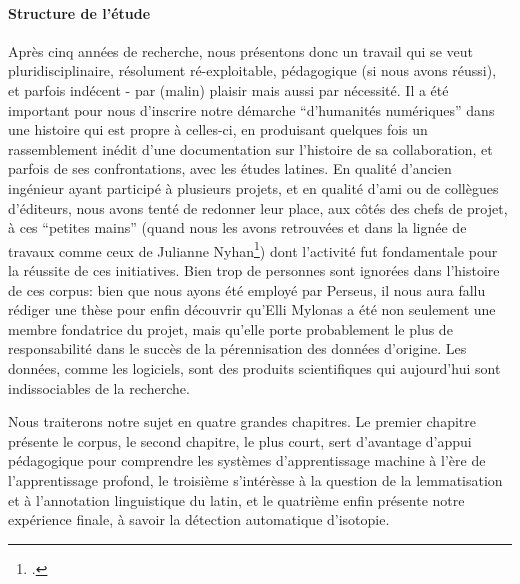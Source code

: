 \paragraph{Structure de l'étude}

Après cinq années de recherche, nous présentons donc un travail qui se veut pluridisciplinaire, résolument ré-exploitable, pédagogique (si nous avons réussi), et parfois indécent - par (malin) plaisir mais aussi par nécessité. Il a été important pour nous d'inscrire notre démarche \enquote{d'humanités numériques} dans une histoire qui est propre à celles-ci, en produisant quelques fois un rassemblement inédit d'une documentation sur l'histoire de sa collaboration, et parfois de ses confrontations, avec les études latines. En qualité d'ancien ingénieur ayant participé à plusieurs projets, et en qualité d'ami ou de collègues d'éditeurs, nous avons tenté de redonner leur place, aux côtés des chefs de projet, à ces \enquote{petites mains} (quand nous les avons retrouvées et dans la lignée de travaux comme ceux de Julianne Nyhan\footcite{nyhan2017uncovering}) dont l'activité fut fondamentale pour la réussite de ces initiatives. Bien trop de personnes sont ignorées dans l'histoire de ces corpus: bien que nous ayons été employé par Perseus, il nous aura fallu rédiger une thèse pour enfin découvrir qu'Elli Mylonas a été non seulement une membre fondatrice du projet, mais qu'elle porte probablement le plus de responsabilité dans le succès de la pérennisation des données d'origine. Les données, comme les logiciels, sont des produits scientifiques qui aujourd'hui sont indissociables de la recherche.

Nous traiterons notre sujet en quatre grandes chapitres. Le premier chapitre présente le corpus, le second chapitre, le plus court, sert d'avantage d'appui pédagogique pour comprendre les systèmes d'apprentissage machine à l'ère de l'apprentissage profond, le troisième s'intérèsse à la question de la lemmatisation et à l'annotation linguistique du latin, et le quatrième enfin présente notre expérience finale, à savoir la détection automatique d'isotopie.

